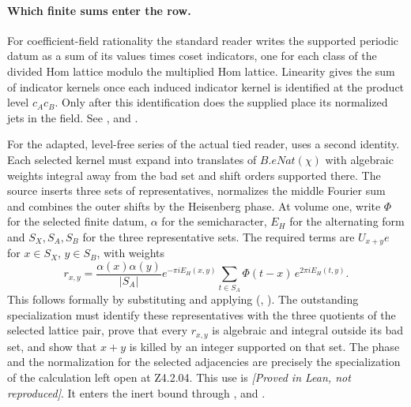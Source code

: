 \paragraph{Which finite sums enter the row.}
For coefficient-field rationality the standard reader writes the supported periodic datum as a sum of its values times coset indicators, one for each class of the divided Hom lattice modulo the multiplied Hom lattice. Linearity gives the sum of indicator kernels once each induced indicator kernel is identified at the product level $c_Ac_B$. Only after this identification does the supplied  place its normalized jets in the field. See ,  and .

For the adapted, level-free series of the actual tied reader,  uses a second identity. Each selected kernel must expand into translates of $B.eNat(\chi)$ with algebraic weights integral away from the bad set and shift orders supported there. The source inserts three sets of representatives, normalizes the middle Fourier sum and combines the outer shifts by the Heisenberg phase. At volume one, write $\Phi$ for the selected finite datum, $\alpha$ for the semicharacter, $E_H$ for the alternating form and $S_X,S_A,S_B$ for the three representative sets. The required terms are $U_{x+y}e$ for $x\in S_X$, $y\in S_B$, with weights
\[
 r_{x,y}=\frac{\alpha(x)\alpha(y)}{|S_A|}
    e^{-\pi i E_H(x,y)}
    \sum_{t\in S_A}\Phi(t-x)\,e^{2\pi i E_H(t,y)}.
\]
This follows formally by substituting  and applying  (, ). The outstanding specialization must identify these representatives with the three quotients of the selected lattice pair, prove that every $r_{x,y}$ is algebraic and integral outside its bad set, and show that $x+y$ is killed by an integer supported on that set.
The phase and the normalization for the selected adjacencies are precisely the specialization of the calculation left open at Z4.2.04. This use is \emph{[Proved in Lean, not reproduced]}. It enters the inert bound through ,  and .

